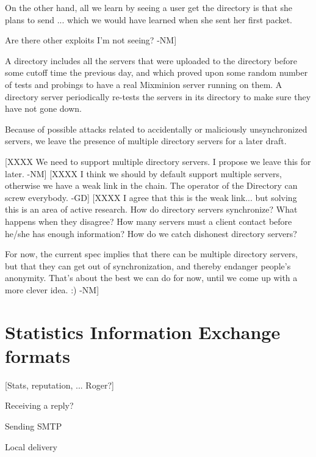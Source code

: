 On the other hand, all we learn by seeing a user get the directory is
that she plans to send ... which we would have learned when she sent
her first packet.

Are there other exploits I'm not seeing? -NM]

A directory includes all the servers that were uploaded to the
directory before some cutoff time the previous day, and which proved
upon some random number of tests and probings to have a real Mixminion
server running on them.  A directory server periodically re-tests
the servers in its directory to make sure they have not gone down.

Because of possible attacks related to accidentally or maliciously
unsynchronized servers, we leave the presence of multiple directory
servers for a later draft.

[XXXX We need to support multiple directory servers. I propose we
   leave this for later. -NM]
[XXXX I think we should by default support multiple servers, otherwise
   we have a weak link in the chain. The operator of the Directory can
   screw everybody. -GD]
[XXXX I agree that this is the weak link... but solving this is an
   area of active research.  How do directory servers synchronize?
   What happens when they disagree?  How many servers must a client
   contact before he/she has enough information?  How do we catch
   dishonest directory servers?

   For now, the current spec implies that there can be multiple
   directory servers, but that they can get out of synchronization,
   and thereby endanger people's anonymity.  That's about the best we
   can do for now, until we come up with a more clever idea. :) -NM]

\section{Statistics Information Exchange formats}

[Stats, reputation, ... Roger?]

Receiving a reply?

Sending SMTP

Local delivery

